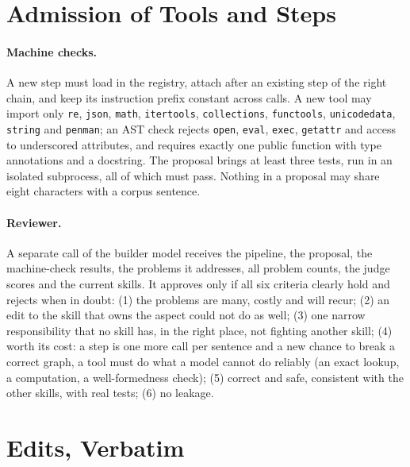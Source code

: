 






\section{Admission of Tools and Steps}
\label{app:review}

\paragraph{Machine checks.} A new step must load in the registry, attach after an existing step of the right chain, and keep its instruction prefix constant across calls. A new tool may import only \texttt{re}, \texttt{json}, \texttt{math}, \texttt{itertools}, \texttt{collections}, \texttt{functools}, \texttt{unicodedata}, \texttt{string} and \texttt{penman}; an AST check rejects \texttt{open}, \texttt{eval}, \texttt{exec}, \texttt{getattr} and access to underscored attributes, and requires exactly one public function with type annotations and a docstring. The proposal brings at least three tests, run in an isolated subprocess, all of which must pass. Nothing in a proposal may share eight characters with a corpus sentence.

\paragraph{Reviewer.} A separate call of the builder model receives the pipeline, the proposal, the machine-check results, the problems it addresses, all problem counts, the judge scores and the current skills. It approves only if all six criteria clearly hold and rejects when in doubt: (1) the problems are many, costly and will recur; (2) an edit to the skill that owns the aspect could not do as well; (3) one narrow responsibility that no skill has, in the right place, not fighting another skill; (4) worth its cost: a step is one more call per sentence and a new chance to break a correct graph, a tool must do what a model cannot do reliably (an exact lookup, a computation, a well-formedness check); (5) correct and safe, consistent with the other skills, with real tests; (6) no leakage.

\section{Edits, Verbatim}
\label{app:edits}

